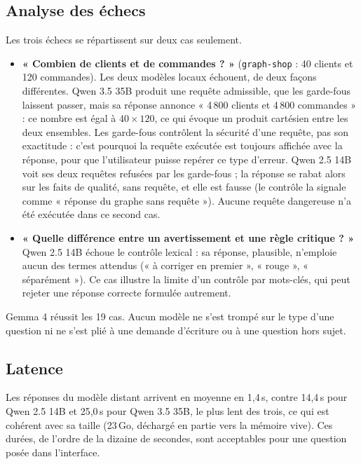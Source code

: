 
\subsection{Analyse des échecs}

Les trois échecs se répartissent sur deux cas seulement.
\begin{itemize}
  \item \textbf{« Combien de clients et de commandes ? »} (\texttt{graph-shop} : 40 clients et 120 commandes). Les deux modèles locaux échouent, de deux façons différentes. Qwen 3.5 35B produit une requête admissible, que les garde-fous laissent passer, mais sa réponse annonce « 4\,800 clients et 4\,800 commandes » : ce nombre est égal à $40 \times 120$, ce qui évoque un produit cartésien entre les deux ensembles. Les garde-fous contrôlent la sécurité d'une requête, pas son exactitude : c'est pourquoi la requête exécutée est toujours affichée avec la réponse, pour que l'utilisateur puisse repérer ce type d'erreur. Qwen 2.5 14B voit ses deux requêtes refusées par les garde-fous ; la réponse se rabat alors sur les faits de qualité, sans requête, et elle est fausse (le contrôle la signale comme « réponse du graphe sans requête »). Aucune requête dangereuse n'a été exécutée dans ce second cas.
  \item \textbf{« Quelle différence entre un avertissement et une règle critique ? »} Qwen 2.5 14B échoue le contrôle lexical : sa réponse, plausible, n'emploie aucun des termes attendus (« à corriger en premier », « rouge », « séparément »). Ce cas illustre la limite d'un contrôle par mots-clés, qui peut rejeter une réponse correcte formulée autrement.
\end{itemize}
Gemma 4 réussit les 19 cas. Aucun modèle ne s'est trompé sur le type d'une question ni ne s'est plié à une demande d'écriture ou à une question hors sujet.

\subsection{Latence}

Les réponses du modèle distant arrivent en moyenne en 1,4\,s, contre 14,4\,s pour Qwen 2.5 14B et 25,0\,s pour Qwen 3.5 35B, le plus lent des trois, ce qui est cohérent avec sa taille (23\,Go, déchargé en partie vers la mémoire vive). Ces durées, de l'ordre de la dizaine de secondes, sont acceptables pour une question posée dans l'interface.

